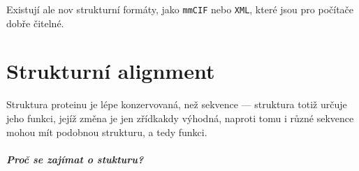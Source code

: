 \documentclass[DIV=8]{scrreprt}
\newcommand{\inlinecode}{\texttt}
\begin{document}
Existují ale nov strukturní formáty, jako \inlinecode{mmCIF} nebo \inlinecode{XML}, které jsou pro počítače dobře čitelné.

\chapter{Strukturní alignment} \label{Strukturní alignment}


Struktura proteinu je lépe konzervovaná, než sekvence --- struktura totiž určuje jeho funkci, jejíž změna je jen zřídkakdy výhodná, naproti tomu i různé sekvence mohou mít podobnou strukturu, a tedy funkci.

\paragraph{Proč se zajímat o stukturu?}
\end{document}
